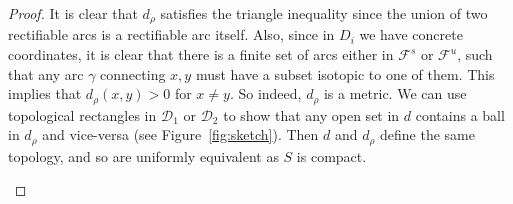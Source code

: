 \documentclass{amsart}
\theoremstyle{plain}
\theoremstyle{definition}
\newcommand{\mc}{\mathcal}
\begin{document}
\begin{proof}
It is clear that $d_\rho$ satisfies the triangle inequality since the union of two rectifiable arcs is a rectifiable arc itself. Also, since in $D_i$ we have concrete coordinates, it is clear that there is a finite set of arcs either in $\mc{F}^s$ or $\mc{F}^u$, such that any arc $\gamma$ connecting $x,y$ must have a subset isotopic to one of them. This implies that $d_\rho(x,y)>0$ for $x\neq y$. So indeed, $d_\rho$ is a metric. We can use topological rectangles in $\mc{D}_1$ or $\mc{D}_2$ to show that any open set in $d$ contains a ball in $d_\rho$ and vice-versa (see Figure~\ref{fig:sketch}). Then $d$ and $d_\rho$ define the same topology, and so are uniformly equivalent as $S$ is compact.

\begin{figure}[ht]
\centering
{}
\end{figure}
\end{proof}
\end{document}
